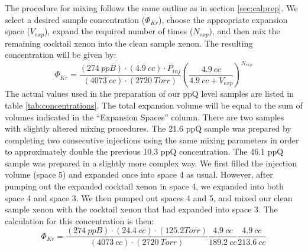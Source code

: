 \documentclass[12pt]{article}
\begin{document}
The procedure for mixing follows the same outline as in section \ref{sec:calprep}. We select a desired sample concentration ($\Phi_{Kr}$), choose the appropriate expansion space ($V_{exp}$), expand the required number of times ($N_{exp}$), and then mix the remaining cocktail xenon into the clean sample xenon. The resulting concentration will be given by:
\begin{equation}
\Phi_{Kr}=\frac{(274 \ ppB)\cdot (4.9 \ cc)\cdot P_{inj}}{(4073 \ cc)\cdot (2720 \ Torr)}\left(\frac{4.9 \ cc}{4.9 \ cc + V_{exp}}\right)^{N_{exp}}
\end{equation}
The actual values used in the preparation of our ppQ level samples are listed in table \ref{tab:concentrations}. The total expansion volume will be equal to the sum of volumes indicated in the ``Expansion Spaces'' column. There are two samples with slightly altered mixing procedures. The 21.6 ppQ sample was prepared by completing two consecutive injections using the same mixing parameters in order to approximately double the previous 10.3 ppQ concentration. The 46.1 ppQ sample was prepared in a slightly more complex way. We first filled the injection volume (space 5) and expanded once into space 4 as usual. However, after pumping out the expanded cocktail xenon in space 4, we expanded into both space 4 and space 3. We then pumped out spaces 4 and 5, and mixed our clean sample xenon with the cocktail xenon that had expanded into space 3. The calculation for this concentration is then:
\begin{equation}
\Phi_{Kr}=\frac{(274 \ ppB)\cdot ( 24.4 \ cc)\cdot (125.2 Torr)}{(4073 \ cc)\cdot (2720 \ Torr)}\frac{4.9 \ cc}{189.2 \ cc }\frac{4.9 \ cc}{213.6 \ cc }
\end{equation}
\end{document}
